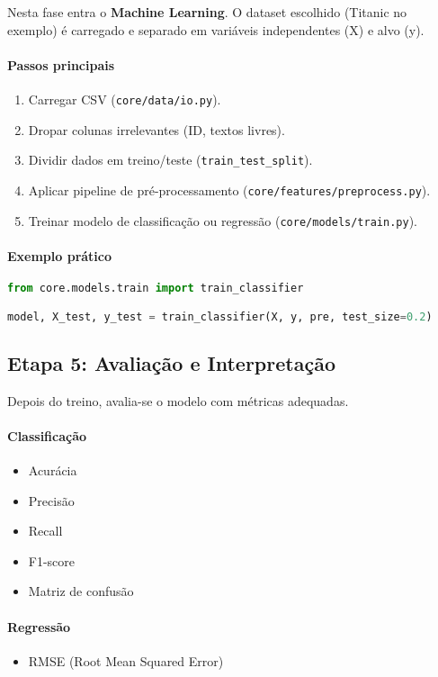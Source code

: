 \documentclass[12pt,a4paper]{article}
\begin{document}
Nesta fase entra o \textbf{Machine Learning}. O dataset escolhido (Titanic no exemplo) é carregado e separado em variáveis independentes (X) e alvo (y).

\paragraph{Passos principais}
\begin{enumerate}
  \item Carregar CSV (\texttt{core/data/io.py}).
  \item Dropar colunas irrelevantes (ID, textos livres).
  \item Dividir dados em treino/teste (\texttt{train\_test\_split}).
  \item Aplicar pipeline de pré-processamento (\texttt{core/features/preprocess.py}).
  \item Treinar modelo de classificação ou regressão (\texttt{core/models/train.py}).
\end{enumerate}

\paragraph{Exemplo prático}
\begin{lstlisting}[language=python]
from core.models.train import train_classifier

model, X_test, y_test = train_classifier(X, y, pre, test_size=0.2)
\end{lstlisting}

\subsection{Etapa 5: Avaliação e Interpretação}

Depois do treino, avalia-se o modelo com métricas adequadas.

\paragraph{Classificação}
\begin{itemize}
  \item Acurácia
  \item Precisão
  \item Recall
  \item F1-score
  \item Matriz de confusão
\end{itemize}

\paragraph{Regressão}
\begin{itemize}
  \item RMSE (Root Mean Squared Error)
\end{itemize}
\end{document}
